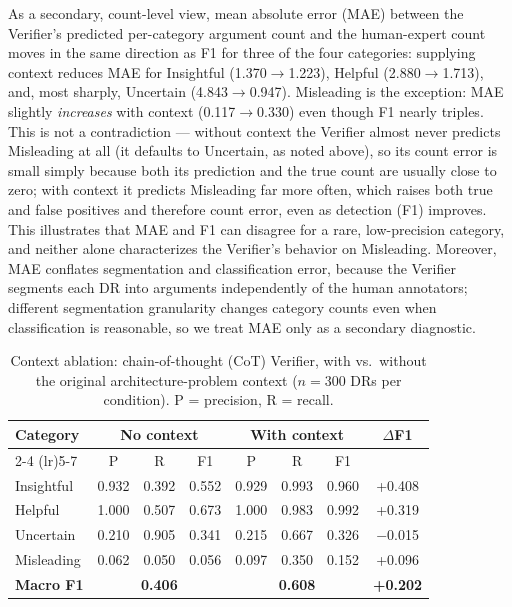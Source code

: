 \documentclass[runningheads]{llncs}
\begin{document}
As a secondary, count-level view, mean absolute error (MAE) between the Verifier's predicted per-category argument count and the human-expert count moves in the same direction as F1 for three of the four categories: supplying context reduces MAE for Insightful (1.370$\rightarrow$1.223), Helpful (2.880$\rightarrow$1.713), and, most sharply, Uncertain (4.843$\rightarrow$0.947). Misleading is the exception: MAE slightly \emph{increases} with context (0.117$\rightarrow$0.330) even though F1 nearly triples. This is not a contradiction --- without context the Verifier almost never predicts Misleading at all (it defaults to Uncertain, as noted above), so its count error is small simply because both its prediction and the true count are usually close to zero; with context it predicts Misleading far more often, which raises both true and false positives and therefore count error, even as detection (F1) improves. This illustrates that MAE and F1 can disagree for a rare, low-precision category, and neither alone characterizes the Verifier's behavior on Misleading. Moreover, MAE conflates segmentation and classification error, because the Verifier segments each DR into arguments independently of the human annotators; different segmentation granularity changes category counts even when classification is reasonable, so we treat MAE only as a secondary diagnostic.

\begin{table}[t]
\centering
\caption{Context ablation: chain-of-thought (CoT) Verifier, with vs.\ without the original architecture-problem context ($n=300$ DRs per condition). P = precision, R = recall.}
\label{tab:context-ablation}
\small
\begin{tabular}{lccccccc}
\toprule
\multirow{2}{*}{Category} & \multicolumn{3}{c}{No context} & \multicolumn{3}{c}{With context} & \multirow{2}{*}{$\Delta$F1} \\
\cmidrule(lr){2-4} \cmidrule(lr){5-7}
 & P & R & F1 & P & R & F1 & \\
\midrule
Insightful  & 0.932 & 0.392 & 0.552 & 0.929 & 0.993 & 0.960 & +0.408 \\
Helpful     & 1.000 & 0.507 & 0.673 & 1.000 & 0.983 & 0.992 & +0.319 \\
Uncertain   & 0.210 & 0.905 & 0.341 & 0.215 & 0.667 & 0.326 & $-$0.015 \\
Misleading  & 0.062 & 0.050 & 0.056 & 0.097 & 0.350 & 0.152 & +0.096 \\
\midrule
\textbf{Macro F1} & \multicolumn{3}{c}{\textbf{0.406}} & \multicolumn{3}{c}{\textbf{0.608}} & \textbf{+0.202} \\
\bottomrule
\end{tabular}
\end{table}
\end{document}
